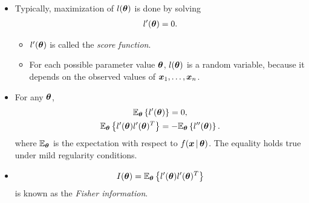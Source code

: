   \begin{frame}
  \begin{itemize}
    \item Typically, maximization of $l(\boldsymbol{\theta})$ is done by solving
  \begin{align*}
    l'(\boldsymbol{\theta}) = 0.
  \end{align*}

  \begin{itemize}
  \item $l'(\boldsymbol{\theta})$ is called the \emph{score function\/}.
  \item For each possible parameter value $\boldsymbol{\theta}$, $l(\boldsymbol{\theta})$
    is a random variable, because it depends on the observed values of
    ${\boldsymbol{x}}_1, \ldots, {\boldsymbol{x}}_{n}$.
  \end{itemize}

  \item For any $\boldsymbol{\theta}$,
  \begin{gather*}
    \mathbb{E}_{\boldsymbol{\theta}}\left\{l'(\boldsymbol{\theta})\right\}=0,
    \\
    \mathbb{E}_{\boldsymbol{\theta}}\left\{l'(\boldsymbol{\theta})l'(\boldsymbol{\theta})\sp{T}\right\} = -
    \mathbb{E}_{\boldsymbol{\theta}}\left\{l''(\boldsymbol{\theta})\right\}.
  \end{gather*}
  where $\mathbb{E}_{\boldsymbol{\theta}}$ is the expectation with respect to
  $f(\boldsymbol{x}\,|\,\boldsymbol{\theta})$. The equality holds true under mild regularity conditions.

  \item
  \begin{align*}
    I(\boldsymbol{\theta})=\mathbb{E}_{\boldsymbol{\theta}}
    \left\{l'(\boldsymbol{\theta})l'(\boldsymbol{\theta})\sp{T}\right\}
  \end{align*}
  is known as the \emph{Fisher information\/}.
  \end{itemize}

  \end{frame}

